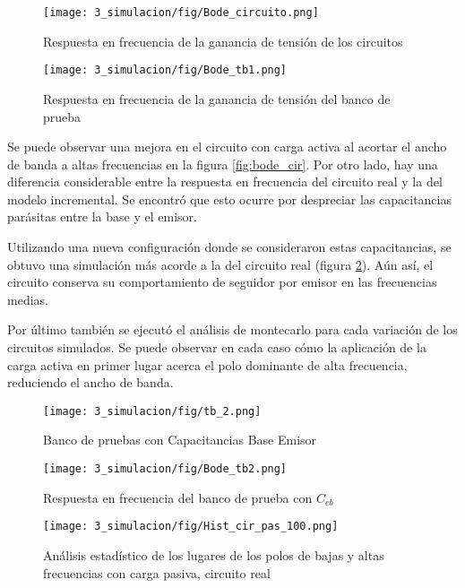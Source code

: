 \begin{figure}[ht]
    \begin{minipage}[t]{0.48\textwidth}
        \centering
        \texttt{[image: 3\_simulacion/fig/Bode\_circuito.png]}
        \caption{Respuesta en frecuencia de la ganancia de tensión de los circuitos}
        \label{fig:bode_cir}
    \end{minipage}\hfill
    \begin{minipage}[t]{0.48\textwidth}
        \centering
        \texttt{[image: 3\_simulacion/fig/Bode\_tb1.png]}
        \caption{Respuesta en frecuencia de la ganancia de tensión del banco de prueba}
        \label{fig:bode_tb1}
    \end{minipage}
\end{figure}

Se puede observar una mejora en el circuito con carga activa al acortar el ancho de banda a altas frecuencias en la figura \ref{fig:bode_cir}. Por otro lado, hay una diferencia considerable entre la respuesta en frecuencia del circuito real y la del modelo incremental. Se encontró que esto ocurre por despreciar las capacitancias parásitas entre la base y el emisor.

Utilizando una nueva configuración donde se consideraron estas capacitancias, se obtuvo una simulación más acorde a la del circuito real (figura \ref{fig:bode_tb2}). Aún así, el circuito conserva su comportamiento de seguidor por emisor en las frecuencias medias.

Por último también se ejecutó el análisis de montecarlo para cada variación de los circuitos simulados. Se puede observar en cada caso cómo la aplicación de la carga activa en primer lugar acerca el polo dominante de alta frecuencia, reduciendo el ancho de banda.

\begin{figure}
    \centering
    \texttt{[image: 3\_simulacion/fig/tb\_2.png]}
    \caption{Banco de pruebas con Capacitancias Base Emisor}
\end{figure}

\begin{figure}
    \centering
    \texttt{[image: 3\_simulacion/fig/Bode\_tb2.png]}
    \caption{Respuesta en frecuencia del banco de prueba con $C_{eb}$}
    \label{fig:bode_tb2}
\end{figure}

\begin{figure}
    \centering
    \texttt{[image: 3\_simulacion/fig/Hist\_cir\_pas\_100.png]}
    \caption{Análisis estadístico de los lugares de los polos de bajas y altas frecuencias con carga pasiva, circuito real}
\end{figure}

